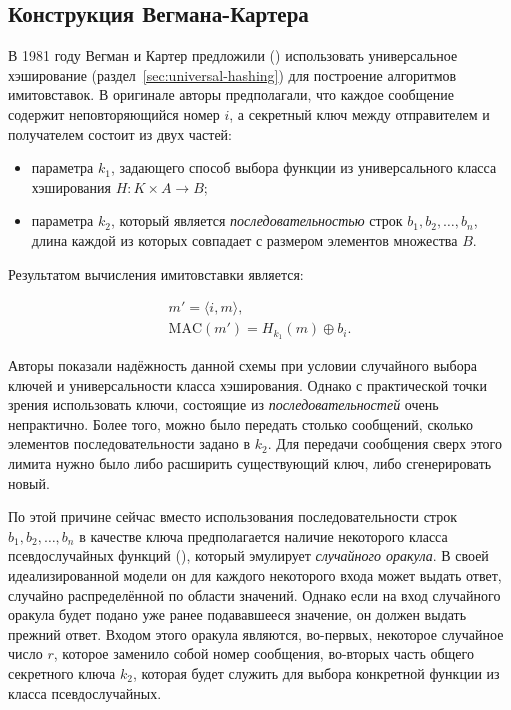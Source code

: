 \subsection{Конструкция Вегмана-Картера}

В 1981 году Вегман и Картер предложили (\cite{Wegman:Carter:1981}) использовать универсальное хэширование (раздел~\ref{sec:universal-hashing}) для построение алгоритмов имитовставок. В оригинале авторы предполагали, что каждое сообщение содержит неповторяющийся номер $i$, а секретный ключ между отправителем и получателем состоит из двух частей:

\begin{itemize}
    \item параметра $k_1$, задающего способ выбора функции из универсального класса хэширования $H: K \times A \to B$;
    \item параметра $k_2$, который является \emph{последовательностью} строк $b_1, b_2, \dots, b_n$, длина каждой из которых совпадает с размером элементов множества $B$.
\end{itemize}

Результатом вычисления имитовставки является:

\[ \begin{array}{l}
    m' = \langle i, m \rangle,\\
    \textrm{MAC} (m') = H_{k_1}(m) \oplus b_i.
\end{array} \]

Авторы показали надёжность данной схемы при условии случайного выбора ключей и универсальности класса хэширования. Однако с практической точки зрения использовать ключи, состоящие из \emph{последовательностей} очень непрактично. Более того, можно было передать столько сообщений, сколько элементов последовательности задано в $k_2$. Для передачи сообщения сверх этого лимита нужно было либо расширить существующий ключ, либо сгенерировать новый.

По этой причине сейчас вместо использования последовательности строк $b_1, b_2, \dots, b_n$ в качестве ключа предполагается наличие некоторого класса псевдослучайных функций (), который эмулирует \emph{случайного оракула}. В своей идеализированной модели он для каждого некоторого входа может выдать ответ, случайно распределённой по области значений. Однако если на вход случайного оракула будет подано уже ранее подававшееся значение, он должен выдать прежний ответ. Входом этого оракула являются, во-первых, некоторое случайное число $r$, которое заменило собой номер сообщения, во-вторых часть общего секретного ключа $k_2$, которая будет служить для выбора конкретной функции из класса псевдослучайных.

